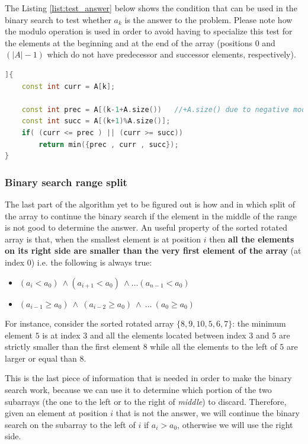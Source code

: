 The Listing \ref{list:test_answer} below shows the condition that can be used in the binary search to test whether $a_k$ is the answer to the problem. Please note how the modulo operation is used in order to avoid having to specialize this test for the elements at the beginning and at the end of the array (positions $0$ and $(|A|-1)$ which do not have predecessor and successor elements, respectively).

\begin{lstlisting}[language=c++, caption={Test to verify whether the binary search can stop because an answer has been found.},label=list:test_answer]]{
	const int curr = A[k];

	const int prec = A[(k-1+A.size()) 	//+A.size() due to negative modulo
	const int succ = A[(k+1)%A.size()];
	if( (curr <= prec ) || (curr >= succ))
		return min({prec , curr , succ});
}
\end{lstlisting}

\subsubsection{Binary search range split}

The last part of the algorithm yet to be figured out is how and in which split of the array to continue the binary search if the element in the middle of the range is not good to determine the answer. An useful property of the sorted rotated array is that, when the smallest element is at position $i$ then \textbf{all the elements on its right side are smaller than the very first element of the array} (at index $0$) i.e. the following is always true:

\begin{itemize}
	\item $	(a_i < a_0) \: \wedge (a_{i+1} < a_0) \: \wedge \ldots (a_{n-1} < a_0) $
	\item $	(a_{i-1} \geq a_0) \: \wedge \: (a_{i-2} \geq a_0) \: \wedge \: \ldots \: (a_{0} \geq a_0) $
\end{itemize}
For instance, consider the sorted rotated array $\{8,9,10,5,6,7\}$: the minimum element $5$ is at index $3$ and all the elements located between index $3$ and $5$ are strictly smaller than the first element $8$ while all the elements to the left of $5$ are larger or equal than $8$.

This is the last piece of information that is needed in order to make the binary search work, because we can use it to determine which portion of the two subarrays (the one to the left or to the right of \textit{middle}) to discard. Therefore, given an element at position $i$ that is not the answer, we will continue the binary search on the subarray to the left of $i$ if $a_i > a_0$, otherwise we will use the right side.

